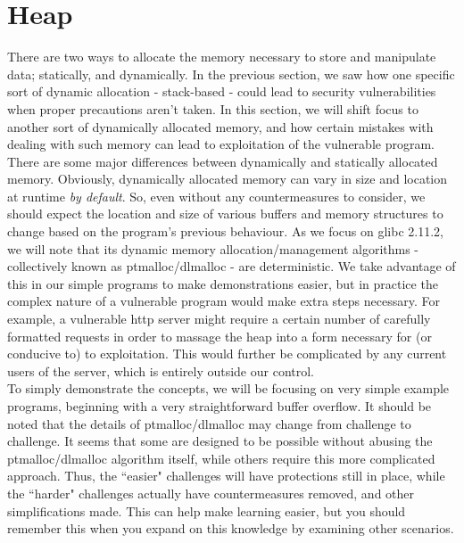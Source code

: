 \section{Heap}
There are two ways to allocate the memory necessary to store and manipulate data;
statically, and dynamically. In the previous section, we saw how one
specific sort of dynamic allocation - stack-based - could lead to
security vulnerabilities when proper precautions aren't taken. In this section,
we will shift focus to another sort of dynamically allocated memory, and how
certain mistakes with dealing with such memory can lead to exploitation
of the vulnerable program. There are some major differences between
dynamically and statically allocated memory. Obviously, dynamically
allocated memory can vary in size and location at runtime \emph{by default}.
So, even without any countermeasures to consider, we should expect
the location and size of various buffers and memory structures to change
based on the program's previous behaviour. As we focus on glibc 2.11.2,
we will note that its dynamic memory allocation/management algorithms - 
collectively known as ptmalloc/dlmalloc - are deterministic. We take
advantage of this in our simple programs to make demonstrations easier,
but in practice the complex nature of a vulnerable program would make
extra steps necessary. For example, a vulnerable http server might
require a certain number of carefully formatted requests in order
to massage the heap into a form necessary for (or conducive to) to exploitation.
This would further be complicated by any current users of the server,
which is entirely outside our control.\\

To simply demonstrate the concepts, we will be focusing on very simple
example programs, beginning with a very straightforward buffer overflow.
It should be noted that the details of ptmalloc/dlmalloc may change from
challenge to challenge. It seems that some are designed to be possible
without abusing the ptmalloc/dlmalloc algorithm itself, while others require
this more complicated approach. Thus, the ``easier" challenges will have
protections still in place, while the ``harder" challenges actually have
countermeasures removed, and other simplifications made. This can help
make learning easier, but you should remember this when you expand
on this knowledge by examining other scenarios.





